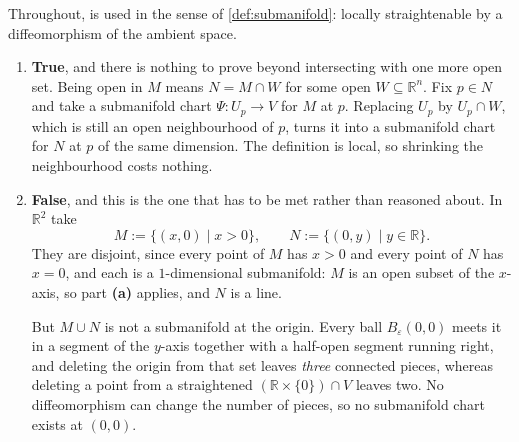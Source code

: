\begin{exercisesolution}
\label{sol:operations_preserving_submanifolds}
Throughout,  is used in the sense of \cref{def:submanifold}: locally
straightenable by a diffeomorphism of the ambient space.
\begin{enumerate}[label=\textbf{(\alph*)}]
  \item \textbf{True}, and there is nothing to prove beyond intersecting with one more open set.
    Being open in $M$ means $N = M \cap W$ for some open $W \subseteq \mathbb{R}^n$. Fix $p \in
    N$ and take a submanifold chart $\Psi : U_p \to V$ for $M$ at $p$. Replacing $U_p$ by
    $U_p \cap W$, which is still an open neighbourhood of $p$, turns it into a submanifold chart
    for $N$ at $p$ of the same dimension. The definition is local, so shrinking the neighbourhood
    costs nothing.
  \item \textbf{False}, and this is the one that has to be met rather than reasoned about.
    In $\mathbb{R}^2$ take
    \[M := \{(x,0) \mid x > 0\}, \qquad N := \{(0,y) \mid y \in \mathbb{R}\}.\]
    They are disjoint, since every point of $M$ has $x > 0$ and every point of $N$ has $x = 0$,
    and each is a $1$-dimensional submanifold: $M$ is an open subset of the $x$-axis, so
    part \textbf{(a)} applies, and $N$ is a line.

    But $M \cup N$ is not a submanifold at the origin. Every ball $B_\varepsilon(0,0)$ meets it
    in a segment of the $y$-axis together with a half-open segment running right, and deleting
    the origin from that set leaves \emph{three} connected pieces, whereas deleting a point from
    a straightened $(\mathbb{R}\times\{0\})\cap V$ leaves two. No diffeomorphism can change the
    number of pieces, so no submanifold chart exists at $(0,0)$.


\end{enumerate}
\end{exercisesolution}
